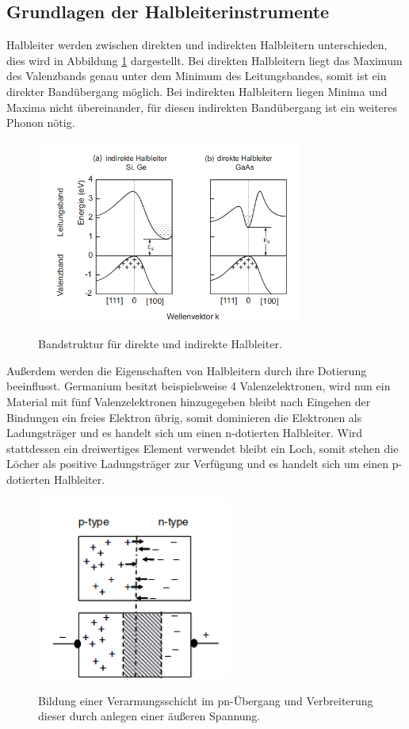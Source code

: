 \subsection{Grundlagen der Halbleiterinstrumente}
Halbleiter werden zwischen direkten und indirekten Halbleitern unterschieden, dies wird
in Abbildung \ref{fig:Band} dargestellt. Bei direkten Halbleitern
liegt das Maximum des Valenzbands genau unter dem Minimum des Leitungsbandes, somit ist ein direkter Bandübergang möglich.
Bei indirekten Halbleitern liegen Minima und Maxima nicht übereinander, für diesen indirekten Bandübergang ist
ein weiteres Phonon nötig.\\

\begin{figure}
  \centering
  \includegraphics[height=6cm]{Band.png}
  \caption{Bandstruktur für direkte und indirekte Halbleiter.}
  \label{fig:Band}
  \cite{Springer3}
\end{figure}

Außerdem werden die Eigenschaften von Halbleitern durch ihre Dotierung beeinflusst. Germanium besitzt
beispielsweise 4 Valenzelektronen, wird nun ein Material mit fünf Valenzelektronen hinzugegeben bleibt nach
Eingehen der Bindungen ein freies Elektron übrig, somit dominieren die Elektronen als Ladungsträger und es handelt
sich um einen n-dotierten Halbleiter.
Wird stattdessen ein dreiwertiges Element verwendet bleibt ein Loch, somit stehen die Löcher als
positive Ladungsträger zur Verfügung und es handelt sich um einen p-dotierten Halbleiter.\\

\begin{figure}[H]
  \centering
  \includegraphics[height=6cm]{pn.png}
  \caption{Bildung einer Verarmungsschicht im pn-Übergang und Verbreiterung dieser durch
  anlegen einer äußeren Spannung.}
  \label{fig:pn}
  \cite{Gilmore2}
\end{figure}

